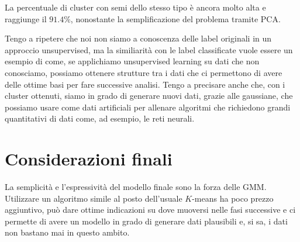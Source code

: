 \documentclass{report}
\begin{document}
    La percentuale di cluster con semi dello stesso tipo è ancora molto alta
e raggiunge il \(91.4\%\), nonostante la semplificazione del problema
tramite PCA.

Tengo a ripetere che noi non siamo a conoscenza delle label originali in
un approccio unsupervised, ma la similiarità con le label classificate
vuole essere un esempio di come, se applichiamo unsupervised learning su
dati che non conosciamo, possiamo ottenere strutture tra i dati che ci
permettono di avere delle ottime basi per fare successive analisi. Tengo
a precisare anche che, con i cluster ottenuti, siamo in grado di
generare nuovi dati, grazie alle gaussiane, che possiamo usare come dati
artificiali per allenare algoritmi che richiedono grandi quantitativi di
dati come, ad esempio, le reti neurali.

\section{Considerazioni finali}\label{considerazioni-finali}

La semplicità e l'espressività del modello finale sono la forza delle
GMM. Utilizzare un algoritmo simile al posto dell'usuale \(K\)-means ha
poco prezzo aggiuntivo, può dare ottime indicazioni su dove muoversi
nelle fasi successive e ci permette di avere un modello in grado di
generare dati plausibili e, si sa, i dati non bastano mai in questo
ambito.

\clearpage
\nocite{*}


\end{document}
